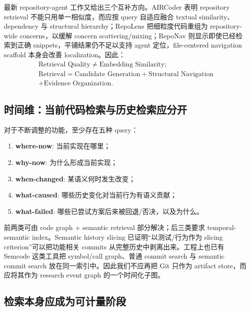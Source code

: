 \documentclass[11pt,a4paper]{ctexart}
\begin{document}
最新 repository-agent 工作又给出三个互补方向。AIRCoder 表明 repository retrieval 不能只用单一相似度，而应按 query 自适应融合 textual similarity、dependency 与 structural hierarchy\cite{shi2026aircoder}；RepoLens 把细粒度代码重组为 repository-wide concerns，以缓解 concern scattering/mixing\cite{wang2025repolens}；RepoNav 则显示即使已经检索到正确 snippets，平铺结果仍不足以支持 agent 定位，file-centered navigation scaffold 本身会改善 localization\cite{chai2026reponav}。因此：
\begin{equation}
\boxed{\begin{gathered}
\text{Retrieval Quality}\neq\text{Embedding Similarity};\\
\text{Retrieval}=\text{Candidate Generation}+\text{Structural Navigation}\\
+\text{Evidence Organization}.
\end{gathered}}
\end{equation}

\subsection{时间维：当前代码检索与历史检索应分开}

对于不断调整的功能，至少存在五种 query：
\begin{enumerate}
  \item \textbf{where-now}: 当前实现在哪里；
  \item \textbf{why-now}: 为什么形成当前实现；
  \item \textbf{when-changed}: 某语义何时发生改变；
  \item \textbf{what-caused}: 哪些历史变化对当前行为有语义贡献；
  \item \textbf{what-failed}: 哪些已尝试方案后来被回退/否决，以及为什么。
\end{enumerate}
前两类可由 code graph + semantic retrieval 部分解决；后三类要求 temporal-semantic index。Semantic history slicing 已证明“以测试/行为作为 slicing criterion”可以把功能相关 commits 从完整历史中剥离出来\cite{li2018semantic}。工程上也已有 Semcode 这类工具把 symbol/call graph、普通 commit search 与 semantic commit search 放在同一索引中\cite{semcode2026}。因此我们不应再把 Git 只作为 artifact store，而应将其作为 research event graph 的一个时间化子图。

\subsection{检索本身应成为可计量阶段}
\end{document}
